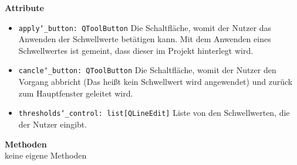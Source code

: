\documentclass{article}
\begin{document}
\textbf{{Attribute}}
\begin{itemize}
\item \texttt{apply\char`_button: QToolButton} \newline Die Schaltfläche, womit der Nutzer das Anwenden der Schwellwerte betätigen kann. Mit dem Anwenden eines Schwellwertes ist gemeint, dass dieser im Projekt hinterlegt wird. 
\item \texttt{cancle\char`_button: QToolButton} \newline Die Schaltfläche, womit der Nutzer den Vorgang abbricht (Das heißt kein Schwellwert wird angewendet) und zurück zum Hauptfenster geleitet wird.
    \item \texttt{thresholds\char`_control: list[QLineEdit]} \newline Liste von den Schwellwerten, die der Nutzer eingibt.
\end{itemize}

\textbf{{Methoden}}
\\keine eigene Methoden
\end{document}
